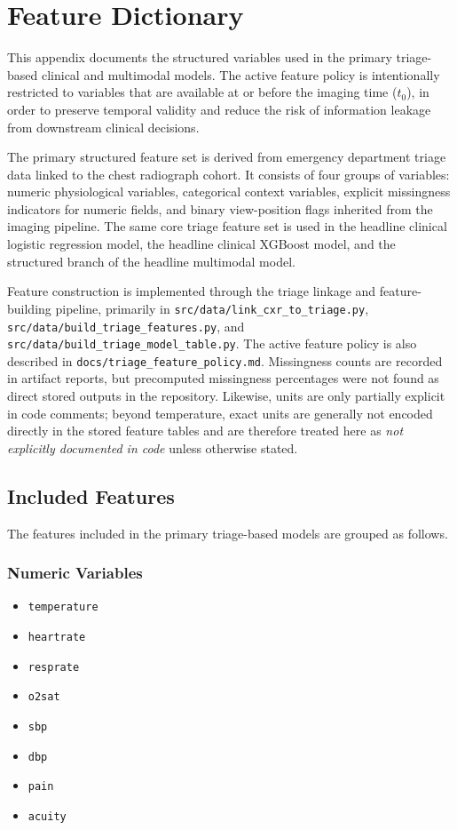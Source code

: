 \chapter{Feature Dictionary}

This appendix documents the structured variables used in the primary triage-based clinical and multimodal models. The active feature policy is intentionally restricted to variables that are available at or before the imaging time ($t_0$), in order to preserve temporal validity and reduce the risk of information leakage from downstream clinical decisions.

The primary structured feature set is derived from emergency department triage data linked to the chest radiograph cohort. It consists of four groups of variables: numeric physiological variables, categorical context variables, explicit missingness indicators for numeric fields, and binary view-position flags inherited from the imaging pipeline. The same core triage feature set is used in the headline clinical logistic regression model, the headline clinical XGBoost model, and the structured branch of the headline multimodal model.

Feature construction is implemented through the triage linkage and feature-building pipeline, primarily in \texttt{src/data/link\_cxr\_to\_triage.py}, \texttt{src/data/build\_triage\_features.py}, and \texttt{src/data/build\_triage\_model\_table.py}. The active feature policy is also described in \texttt{docs/triage\_feature\_policy.md}. Missingness counts are recorded in artifact reports, but precomputed missingness percentages were not found as direct stored outputs in the repository. Likewise, units are only partially explicit in code comments; beyond temperature, exact units are generally not encoded directly in the stored feature tables and are therefore treated here as \emph{not explicitly documented in code} unless otherwise stated.

\section{Included Features}

The features included in the primary triage-based models are grouped as follows.

\subsection*{Numeric Variables}
\begin{itemize}
    \item \texttt{temperature}
    \item \texttt{heartrate}
    \item \texttt{resprate}
    \item \texttt{o2sat}
    \item \texttt{sbp}
    \item \texttt{dbp}
    \item \texttt{pain}
    \item \texttt{acuity}
\end{itemize}

